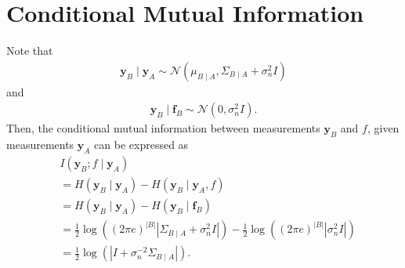\documentclass{article}
\def\*#1{\bm{#1}}
\begin{document}
\section{Conditional Mutual Information}
Note that
\begin{align*}
\*y_B\mid \*y_A \sim \mathcal{N}\left(\mu_{B\mid A}, \Sigma_{B\mid A} + \sigma_n^2 I\right)
\end{align*}
and
\begin{align*}
\*y_B\mid \*f_B \sim \mathcal{N}\left(0, \sigma_n^2 I\right).
\end{align*}
Then, the conditional mutual information between measurements $\*y_B$ and $f$,
given measurements $\*y_A$ can be expressed as
\begin{align*}
&I(\*y_B; f \mid \*y_A)\\
&=H(\*y_B\mid \*y_A) - H(\*y_B\mid \*y_A, f)\\
&=H(\*y_B\mid \*y_A) - H(\*y_B\mid \*f_B)\\
&=\frac{1}{2}\log\left((2\pi e)^{|B|}\left|\Sigma_{B\mid A} + \sigma_n^2 I\right|\right) -
  \frac{1}{2}\log\left((2\pi e)^{|B|}\left|\sigma_n^2 I\right|\right)\\
&=\frac{1}{2}\log\left(\left|I + \sigma_n^{-2}\Sigma_{B\mid A}\right|\right).
\end{align*}
\end{document}
